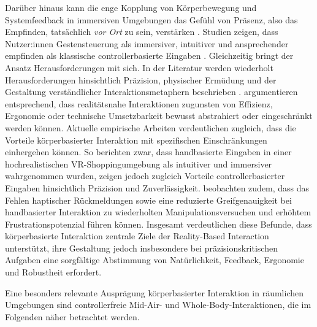 Darüber hinaus kann die enge Kopplung von Körperbewegung und Systemfeedback in immersiven Umgebungen das Gefühl von Präsenz, also das Empfinden, tatsächlich \textit{vor Ort} zu sein, verstärken \parencite{slatersanchesvivies2016enhancingourliveswithimmersivevirtualreality, slater1997frameworkForImmersiveVirtualEnvironments}. Studien zeigen, dass Nutzer:innen Gestensteuerung als immersiver, intuitiver und ansprechender empfinden als klassische controllerbasierte Eingaben \parencite{spittle2023reviewinteractiontechniquesforimmersiveenvironments, vona2025handsvscontrollerscomparing}. Gleichzeitig bringt der Ansatz Herausforderungen mit sich. In der Literatur werden wiederholt Herausforderungen hinsichtlich Präzision, physischer Ermüdung und der Gestaltung verständlicher Interaktionsmetaphern beschrieben \parencite{spittle2023reviewinteractiontechniquesforimmersiveenvironments, kostic2024exploringmidairhandinteractionindatavisualization}.
\Textcite{jacob2008realitybasedinteraction} argumentieren entsprechend, dass realitätsnahe Interaktionen zugunsten von Effizienz, Ergonomie oder technische Umsetzbarkeit bewusst abstrahiert oder eingeschränkt werden können.
Aktuelle empirische Arbeiten verdeutlichen zugleich, dass die Vorteile körper\-basierter Interaktion mit spezifischen Einschränkungen einhergehen können. So berichten \textcite{vona2025handsvscontrollerscomparing} zwar, dass handbasierte Eingaben in einer hochrealistischen VR-Shoppingumgebung als intuitiver und immersiver wahrgenommen wurden, zeigen jedoch zugleich Vorteile controllerbasierter Eingaben hinsichtlich Präzision und Zuverlässigkeit. \textcite{vona2025handsvscontrollerscomparing} beobachten zudem, dass das Fehlen haptischer Rückmeldungen sowie eine reduzierte Greifgenauigkeit bei handbasierter Interaktion zu wiederholten Manipulationsversuchen und erhöhtem Frustrationspotenzial führen können. Insgesamt verdeutlichen diese Befunde, dass körper\-basierte Interaktion zentrale Ziele der Reality-Based Interaction unterstützt, ihre Gestaltung jedoch insbesondere bei präzisionskritischen Aufgaben eine sorgfältige Abstimmung von Natürlichkeit, Feedback, Ergonomie und Robustheit erfordert.

Eine besonders relevante Ausprägung körper\-basierter Interaktion in räumlichen Umgebungen sind controllerfreie Mid-Air- und Whole-Body-Interaktionen, die im Folgenden näher betrachtet werden.


